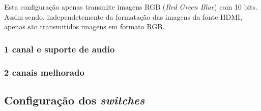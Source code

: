 Esta configuração apenas transmite imagens RGB (\textit{Red Green Blue}) com 10 bits. Assim sendo, independetemente da formatação das imagens da fonte HDMI, apenas são transmitidos imagens em formato RGB.

\subsubsection{1 canal e suporte de audio} \label {subsubsec:HDMIconfig+audio}
\subsubsection{2 canais melhorado} \label{subsubsec:HDMIconfigMelhorado}

\subsection{Configuração dos \textit{switches}}